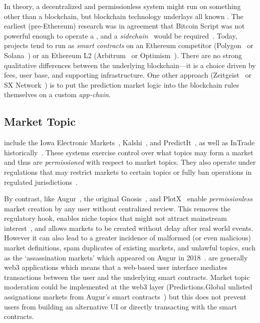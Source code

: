 In theory, a decentralized and permissionless system might run on something other than a blockchain, but blockchain technology underlays all known \depms. The earliest (pre-Ethereum) research was in agreement that Bitcoin Script was not powerful enough to operate a \depm, and a \textit{sidechain}~\cite{BCD+14} would be required~\cite{Sz14,BCFKMN14}. Today, projects tend to run as \textit{smart contracts} on an Ethereum competitor (\eg Polygon~\cite{AKN21} or Solana~\cite{Yak18}) or an Ethereum L2 (\eg Arbitrum~\cite{KGCWF18} or Optimism~\cite{op}). There are no strong qualitative differences between the underlying blockchain---it is a choice driven by fees, user base, and supporting infrastructure. One other approach (\eg Zeitgeist~\cite{zeit} or SX Network~\cite{sx}) is to put the prediction market logic into the blockchain rules themselves on a custom \textit{app-chain}.




\subsection{Market Topic}\label{wf:topic}



\cepms include the Iowa Electronic Markets~\cite{iem}, Kalshi~\cite{kalshi_docs}, and PredictIt~\cite{predictit_faq}, as well as InTrade historically~\cite{intrade}. These systems exercise control over what topics may form a market and thus are \textit{permissioned} with respect to market topics. They also operate under regulations that may restrict markets to certain topics or fully ban operations in regulated jurisdictions~\cite{Du19,Ma24}. 

By contrast, \depms like Augur~\cite{AKPWZ15,AKPWZ19}, the original Gnosis~\cite{Gn17}, and PlotX~\cite{plotx_docs} enable \textit{permissionless} market creation by any user without centralized review. This removes the regulatory hook, enables niche topics that might not attract mainstream interest~\cite{WZ24}, and allows markets to be created without delay after real world events. However it can also lead to a greater incidence of malformed (or even malicious) market definitions, spam duplicates of existing markets, and unlawful topics, such as the `assassination markets' which appeared on Augur in 2018~\cite{Du19}. \depms are generally web3 applications which means that a web-based user interface mediates transactions between the user and the underlying smart contracts. Market topic moderation could be implemented at the web3 layer (\eg Predictions.Global unlisted assignations markets from Augur's smart contracts~\cite{Du19}) but this does not prevent users from building an alternative UI or directly transacting with the smart contracts. 


